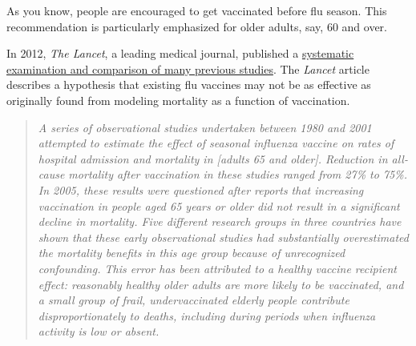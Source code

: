 \documentclass[
  letterpaper,
  DIV=11,
  numbers=noendperiod,
  oneside]{scrartcl}
\begin{document}
\begin{tcolorbox}[enhanced jigsaw, colbacktitle=quarto-callout-note-color!10!white, opacityback=0, breakable, opacitybacktitle=0.6, colback=white, coltitle=black, arc=.35mm, title=\textcolor{quarto-callout-note-color}{\faInfo}\hspace{0.5em}{Example: The flu vaccine}, left=2mm, colframe=quarto-callout-note-color-frame, rightrule=.15mm, bottomrule=.15mm, leftrule=.75mm, bottomtitle=1mm, toptitle=1mm, titlerule=0mm, toprule=.15mm]

As you know, people are encouraged to get vaccinated before flu season.
This recommendation is particularly emphasized for older adults, say, 60
and over.

In 2012, \emph{The Lancet}, a leading medical journal, published a
\href{https://www.thelancet.com/journals/laninf/article/PIIS1473-3099(11)70295-X/fulltext}{systematic
examination and comparison of many previous studies}.
{} The \emph{Lancet}
article describes a hypothesis that existing flu vaccines may not be as
effective as originally found from modeling mortality as a function of
vaccination.

\begin{quote}
\emph{A series of observational studies undertaken between 1980 and 2001
attempted to estimate the effect of seasonal influenza vaccine on rates
of hospital admission and mortality in {[}adults 65 and older{]}.
Reduction in all-cause mortality after vaccination in these studies
ranged from 27\% to 75\%. In 2005, these results were questioned after
reports that increasing vaccination in people aged 65 years or older did
not result in a significant decline in mortality. Five different
research groups in three countries have shown that these early
observational studies had substantially overestimated the mortality
benefits in this age group because of unrecognized confounding. This
error has been attributed to a healthy vaccine recipient effect:
reasonably healthy older adults are more likely to be vaccinated, and a
small group of frail, undervaccinated elderly people contribute
disproportionately to deaths, including during periods when influenza
activity is low or absent.}
\end{quote}

\begin{figure}[H]


\end{figure}
\end{tcolorbox}
\end{document}
